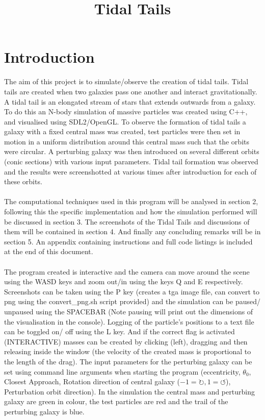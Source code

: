 \documentclass[10pt,a4paper]{article}
\begin{document}
\begin{titlingpage}
\title{Tidal Tails}
\author{}
\maketitle
\begin{abstract}
	
\end{abstract}
	
	
\end{titlingpage}

\clearpage
\section{Introduction}
The aim of this project is to simulate/observe the creation of tidal tails. Tidal tails are created when two galaxies pass one another and interact gravitationally. A tidal tail is an elongated stream of stars that extends outwards from a galaxy.  To do this an N-body simulation of massive particles was created using C++, and visualised using SDL2/OpenGL. To observe the formation of tidal tails a galaxy with a fixed central mass was created, test particles were then set in motion in a uniform distribution around this central mass such that the orbits were circular. A perturbing galaxy was then introduced on several different orbits (conic sections) with various input parameters. Tidal tail formation was observed and the results were screenshotted at various times after introduction for each of these orbits. 
\\
\\
The computational techniques used in this program will be analysed in section 2, following this the specific implementation and how the simulation performed will be discussed in section 3. The screenshots of the Tidal Tails and discussions of them will be contained in section 4. And finally any concluding remarks will be in section 5. An appendix containing instructions and full code listings is included at the end of this document. 
\\
\\
The program created is interactive and the camera can move around the scene using the WASD keys and zoom out/in using the keys Q and E respectively. Screenshots can be taken using the P key (creates a tga image file, can convert to png using the convert\_png.sh script provided) and the simulation can be paused/ unpaused using the SPACEBAR (Note pausing will print out the dimensions of the visualisation in the console). Logging of the particle's positions to a text file can be toggled on/ off using the L key. And if the correct flag is activated (INTERACTIVE) masses can be created by clicking (left), dragging and then releasing inside the window (the velocity of the created mass is proportional to the length of the drag). The input parameters for the perturbing galaxy can be set using command line arguments when starting the program (eccentricity, $\theta_0$, Closest Approach, Rotation direction of central galaxy ($-1=\circlearrowright, 1=\circlearrowleft$), Perturbation orbit direction). In the simulation the central mass and perturbing galaxy are green in colour, the test particles are red and the trail of the perturbing galaxy is blue.
\end{document}
